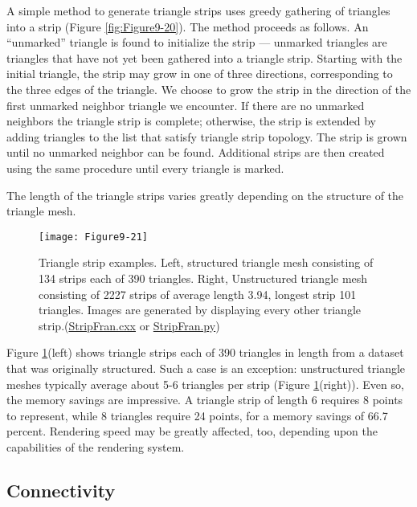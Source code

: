 A simple method to generate triangle strips uses greedy gathering of triangles into a strip (Figure \ref{fig:Figure9-20}). The method proceeds as follows. An ``unmarked'' triangle is found to initialize the strip --- unmarked triangles are triangles that have not yet been gathered into a triangle strip. Starting with the initial triangle, the strip may grow in one of three directions, corresponding to the three edges of the triangle. We choose to grow the strip in the direction of the first unmarked neighbor triangle we encounter. If there are no unmarked neighbors the triangle strip is complete; otherwise, the strip is extended by adding triangles to the list that satisfy triangle strip topology. The strip is grown until no unmarked neighbor can be found. Additional strips are then created using the same procedure until every triangle is marked.

The length of the triangle strips varies greatly depending on the structure of the triangle mesh.

\begin{figure}[!htb]
	\centering
	\texttt{[image: Figure9-21]}
	\caption{Triangle strip examples. Left, structured triangle mesh consisting of 134 strips each of 390 triangles. Right, Unstructured triangle mesh consisting of 2227 strips of average length 3.94, longest strip 101 triangles. Images are generated by displaying every other triangle strip.(\href{https://lorensen.github.io/VTKExamples/site/Cxx/Rendering/StripFran/}{StripFran.cxx} or \href{https://lorensen.github.io/VTKExamples/site/Python/Rendering/StripFran/}{StripFran.py})}
	\label{fig:Figure9-21}
\end{figure}


Figure \ref{fig:Figure9-21}(left) shows triangle strips each of 390 triangles in length from a dataset that was originally structured. Such a case is an exception: unstructured triangle meshes typically average about 5-6 triangles per strip (Figure \ref{fig:Figure9-21}(right)). Even so, the memory savings are impressive. A triangle strip of length 6 requires 8 points to represent, while 8 triangles require 24 points, for a memory savings of 66.7 percent. Rendering speed may be greatly affected, too, depending upon the capabilities of the rendering system.

\subsection{Connectivity}
\label{subsec:connectivity}

